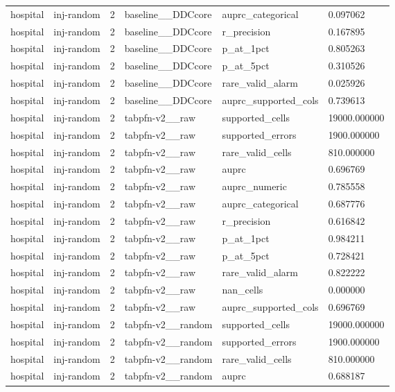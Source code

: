 \begin{tabular}{llllll}
hospital & inj-random & 2 & baseline\_\_DDCcore & auprc\_categorical & 0.097062 \\
hospital & inj-random & 2 & baseline\_\_DDCcore & r\_precision & 0.167895 \\
hospital & inj-random & 2 & baseline\_\_DDCcore & p\_at\_1pct & 0.805263 \\
hospital & inj-random & 2 & baseline\_\_DDCcore & p\_at\_5pct & 0.310526 \\
hospital & inj-random & 2 & baseline\_\_DDCcore & rare\_valid\_alarm & 0.025926 \\
hospital & inj-random & 2 & baseline\_\_DDCcore & auprc\_supported\_cols & 0.739613 \\
hospital & inj-random & 2 & tabpfn-v2\_\_raw & supported\_cells & 19000.000000 \\
hospital & inj-random & 2 & tabpfn-v2\_\_raw & supported\_errors & 1900.000000 \\
hospital & inj-random & 2 & tabpfn-v2\_\_raw & rare\_valid\_cells & 810.000000 \\
hospital & inj-random & 2 & tabpfn-v2\_\_raw & auprc & 0.696769 \\
hospital & inj-random & 2 & tabpfn-v2\_\_raw & auprc\_numeric & 0.785558 \\
hospital & inj-random & 2 & tabpfn-v2\_\_raw & auprc\_categorical & 0.687776 \\
hospital & inj-random & 2 & tabpfn-v2\_\_raw & r\_precision & 0.616842 \\
hospital & inj-random & 2 & tabpfn-v2\_\_raw & p\_at\_1pct & 0.984211 \\
hospital & inj-random & 2 & tabpfn-v2\_\_raw & p\_at\_5pct & 0.728421 \\
hospital & inj-random & 2 & tabpfn-v2\_\_raw & rare\_valid\_alarm & 0.822222 \\
hospital & inj-random & 2 & tabpfn-v2\_\_raw & nan\_cells & 0.000000 \\
hospital & inj-random & 2 & tabpfn-v2\_\_raw & auprc\_supported\_cols & 0.696769 \\
hospital & inj-random & 2 & tabpfn-v2\_\_random & supported\_cells & 19000.000000 \\
hospital & inj-random & 2 & tabpfn-v2\_\_random & supported\_errors & 1900.000000 \\
hospital & inj-random & 2 & tabpfn-v2\_\_random & rare\_valid\_cells & 810.000000 \\
hospital & inj-random & 2 & tabpfn-v2\_\_random & auprc & 0.688187 \\

\end{tabular}
